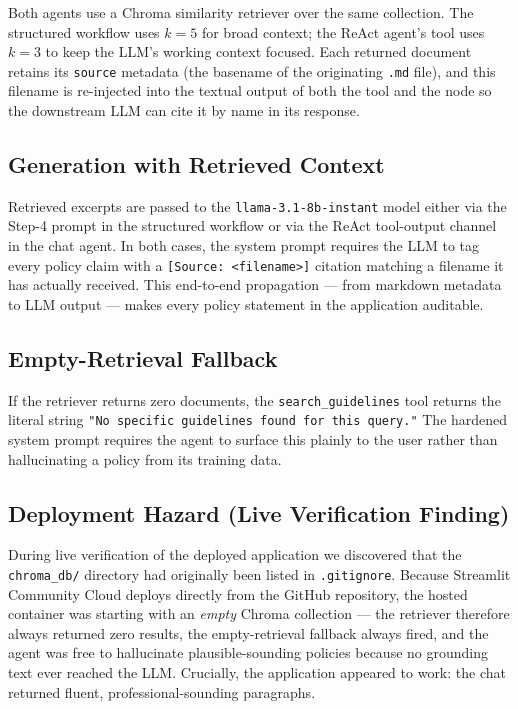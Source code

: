 \documentclass[11pt,a4paper]{article}
\begin{document}
Both agents use a Chroma similarity retriever over the same collection.
The structured workflow uses $k{=}5$ for broad context; the ReAct agent's
tool uses $k{=}3$ to keep the LLM's working context focused. Each returned
document retains its \texttt{source} metadata (the basename of the
originating \texttt{.md} file), and this filename is re-injected into the
textual output of both the tool and the node so the downstream LLM can
cite it by name in its response.

\subsection{Generation with Retrieved Context}

Retrieved excerpts are passed to the \texttt{llama-3.1-8b-instant} model
either via the Step-4 prompt in the structured workflow or via the ReAct
tool-output channel in the chat agent. In both cases, the system prompt
requires the LLM to tag every policy claim with a
\texttt{[Source: <filename>]} citation matching a filename it has
actually received. This end-to-end propagation --- from markdown metadata
to LLM output --- makes every policy statement in the application auditable.

\subsection{Empty-Retrieval Fallback}

If the retriever returns zero documents, the \texttt{search\_guidelines}
tool returns the literal string
\texttt{"No specific guidelines found for this query."} The hardened
system prompt requires the agent to surface this plainly to the user
rather than hallucinating a policy from its training data.

\subsection{Deployment Hazard (Live Verification Finding)}\label{sec:deployment_hazard}

During live verification of the deployed application we discovered that
the \texttt{chroma\_db/} directory had originally been listed in
\texttt{.gitignore}. Because Streamlit Community Cloud deploys directly
from the GitHub repository, the hosted container was starting with an
\emph{empty} Chroma collection --- the retriever therefore always
returned zero results, the empty-retrieval fallback always fired, and the
agent was free to hallucinate plausible-sounding policies because no
grounding text ever reached the LLM. Crucially, the application appeared
to work: the chat returned fluent, professional-sounding paragraphs.
\end{document}
